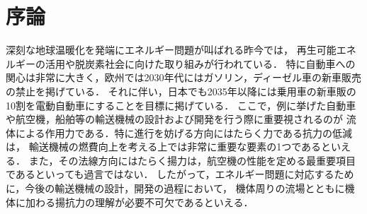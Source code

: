 
\section{序論}

深刻な地球温暖化を発端にエネルギー問題が叫ばれる昨今では，
再生可能エネルギーの活用や脱炭素社会に向けた取り組み\cite{2021_roadmap}が行われている．
特に自動車への関心は非常に大きく，欧州では2030年代にはガソリン，ディーゼル車の新車販売の禁止を掲げている．
それに伴い，日本でも2035年以降には乗用車の新車販の10割を電動自動車にすることを目標に掲げている．
ここで，例に挙げた自動車や航空機，船舶等の輸送機械の設計および開発を行う際に重要視されるのが
流体による作用力である．特に進行を妨げる方向にはたらく力である抗力の低減は，
輸送機械の燃費向上を考える上では非常に重要な要素の1つであるといえる．
また，その法線方向にはたらく揚力は，航空機の性能を定める最重要項目であるといっても過言ではない．
したがって，エネルギー問題に対応するために，今後の輸送機械の設計，開発の過程において，
機体周りの流場とともに機体に加わる揚抗力の理解が必要不可欠であるといえる．

